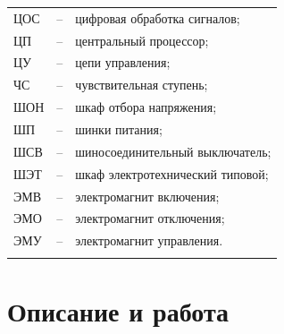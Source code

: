 \documentclass[a4paper, 12pt, table, hidelinks, DIV=calc]{extarticle}
\begin{document}
\begin{longtable}{>{\raggedright\arraybackslash}m{2cm}>{\raggedright\arraybackslash}m{0.5cm}>{\raggedright\arraybackslash}m{20cm}}
ЦОС & -- & цифровая обработка сигналов; \\
ЦП & -- & центральный процессор; \\
ЦУ & -- & цепи управления; \\
ЧС & -- & чувствительная ступень; \\
ШОН & -- & шкаф отбора напряжения; \\
ШП & -- & шинки питания; \\
ШСВ & -- & шиносоединительный выключатель; \\
ШЭТ & -- & шкаф электротехнический типовой; \\
ЭМВ & -- & электромагнит включения; \\
ЭМО & -- & электромагнит отключения; \\
ЭМУ & -- & электромагнит управления. \\
{\color{white}\fontsize{0.1pt}{0.1pt}\selectfont<endABBRS>}
\end{longtable}
\newpage
\color{unidarkgreen}\section[Описание и работа]{Описание и работа}
\color{black}

\color{black}
\end{document}
